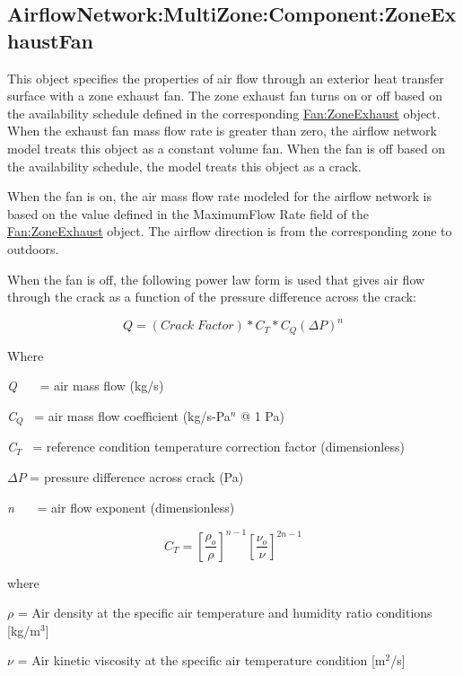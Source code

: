 \subsection{AirflowNetwork:MultiZone:Component:ZoneExhaustFan}\label{airflownetworkmultizonecomponentzoneexhaustfan}

This object specifies the properties of air flow through an exterior heat transfer surface with a zone exhaust fan. The zone exhaust fan turns on or off based on the availability schedule defined in the corresponding \hyperref[fanzoneexhaust]{Fan:ZoneExhaust} object. When the exhaust fan mass flow rate is greater than zero, the airflow network model treats this object as a constant volume fan. When the fan is off based on the availability schedule, the model treats this object as a crack.

When the fan is on, the air mass flow rate modeled for the airflow network is based on the value defined in the MaximumFlow Rate field of the \hyperref[fanzoneexhaust]{Fan:ZoneExhaust} object. The airflow direction is from the corresponding zone to outdoors.

When the fan is off, the following power law form is used that gives air flow through the crack as a function of the pressure difference across the crack:

\begin{equation}
Q = \left( Crack\;Factor \right) * C_T * C_Q \left( \Delta P \right)^{n}
\end{equation}

Where

\emph{Q}~~~ = air mass flow (kg/s)

\emph{C\(_{Q}\)}~ = air mass flow coefficient (kg/s-Pa\(^{n}\) @ 1 Pa)

\emph{C\(_{T}\)}~ = reference condition temperature correction factor (dimensionless)

\(\Delta P\) = pressure difference across crack (Pa)

\emph{n}~~~ = air flow exponent (dimensionless)

\begin{equation}
{C_T} = {\left[ {\frac{{{\rho_o}}}{\rho }} \right]^{n - 1}}{\left[ {\frac{{{\nu_o}}}{\nu }} \right]^{2n - 1}}
\end{equation}

where

\(\rho\) = Air density at the specific air temperature and humidity ratio conditions {[}kg/m\(^{3}\){]}

\(\nu\) = Air kinetic viscosity at the specific air temperature condition {[}m\(^{2}\)/s{]}

